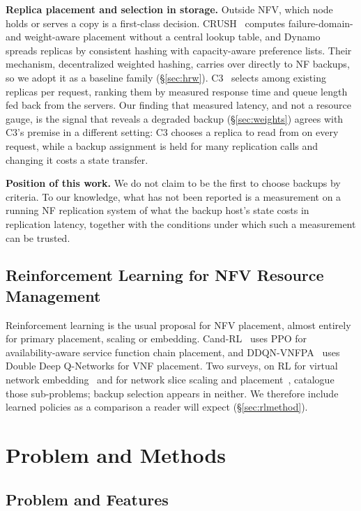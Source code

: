 \documentclass[journal]{IEEEtran}
\begin{document}
\textbf{Replica placement and selection in storage.} Outside NFV, which node
holds or serves a copy is a first-class decision. CRUSH~\cite{weil2006crush}
computes failure-domain- and weight-aware placement without a central lookup
table, and Dynamo~\cite{decandia2007dynamo} spreads replicas by consistent
hashing with capacity-aware preference lists. Their mechanism, decentralized
weighted hashing, carries over directly to NF backups, so we adopt it as a
baseline family (\S\ref{sec:hrw}). C3~\cite{suresh2015c3} selects among existing
replicas per request, ranking them by measured response time and queue length
fed back from the servers. Our finding that measured latency, and not a resource
gauge, is the signal that reveals a degraded backup (\S\ref{sec:weights}) agrees
with C3's premise in a different setting: C3 chooses a replica to read from on
every request, while a backup assignment is held for many replication calls and
changing it costs a state transfer.

\textbf{Position of this work.} We do not claim to be the first to choose
backups by criteria. To our knowledge, what has not been reported is a
measurement on a running NF replication system of what the backup host's state
costs in replication latency, together with the conditions under which such a
measurement can be trusted.

\subsection{Reinforcement Learning for NFV Resource Management}

Reinforcement learning is the usual proposal for NFV placement, almost entirely
for primary placement, scaling or embedding. Cand-RL~\cite{santos2022reinforcement}
uses PPO for availability-aware service function chain placement, and
DDQN-VNFPA~\cite{pei2019optimal} uses Double Deep Q-Networks for VNF placement.
Two surveys, on RL for virtual network embedding~\cite{lim2023reinforcement} and
for network slice scaling and placement~\cite{saha2023deep}, catalogue those
sub-problems; backup selection appears in neither. We therefore include learned
policies as a comparison a reader will expect (\S\ref{sec:rlmethod}).

\section{Problem and Methods}
\label{sec:methods}

\subsection{Problem and Features}
\end{document}
